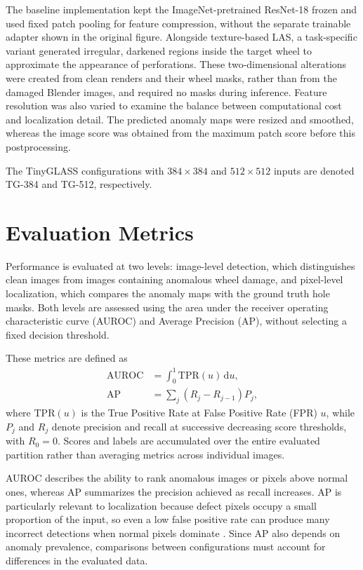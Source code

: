 The baseline implementation kept the ImageNet-pretrained ResNet-18 frozen and used fixed patch pooling for feature compression, without the separate trainable adapter shown in the original figure. Alongside texture-based LAS, a task-specific variant generated irregular, darkened regions inside the target wheel to approximate the appearance of perforations. These two-dimensional alterations were created from clean renders and their wheel masks, rather than from the damaged Blender images, and required no masks during inference. Feature resolution was also varied to examine the balance between computational cost and localization detail. The predicted anomaly maps were resized and smoothed, whereas the image score was obtained from the maximum patch score before this postprocessing.

The TinyGLASS configurations with \(384\times384\) and \(512\times512\) inputs are denoted TG-384 and TG-512, respectively.

\section{Evaluation Metrics}
\label{sec:damage-evaluation-metrics}

Performance is evaluated at two levels: image-level detection, which distinguishes clean images from images containing anomalous wheel damage, and pixel-level localization, which compares the anomaly maps with the ground truth hole masks. Both levels are assessed using the area under the receiver operating characteristic curve (AUROC) and Average Precision (AP), without selecting a fixed decision threshold.

These metrics are defined as
\begin{equation}
    \begin{aligned}
        \mathrm{AUROC}
         & = \int_0^1 \mathrm{TPR}(u)\,\mathrm{d}u, \\
        \mathrm{AP}
         & = \sum_j (R_j - R_{j-1})P_j,
    \end{aligned}
    \label{eq:damage-evaluation-metrics}
\end{equation}
where \(\mathrm{TPR}(u)\) is the True Positive Rate at False Positive Rate (FPR) \(u\), while \(P_j\) and \(R_j\) denote precision and recall at successive decreasing score thresholds, with \(R_0=0\). Scores and labels are accumulated over the entire evaluated partition rather than averaging metrics across individual images.

AUROC describes the ability to rank anomalous images or pixels above normal ones, whereas AP summarizes the precision achieved as recall increases. AP is particularly relevant to localization because defect pixels occupy a small proportion of the input, so even a low false positive rate can produce many incorrect detections when normal pixels dominate \cite{saito2015precisionrecall}. Since AP also depends on anomaly prevalence, comparisons between configurations must account for differences in the evaluated data.

